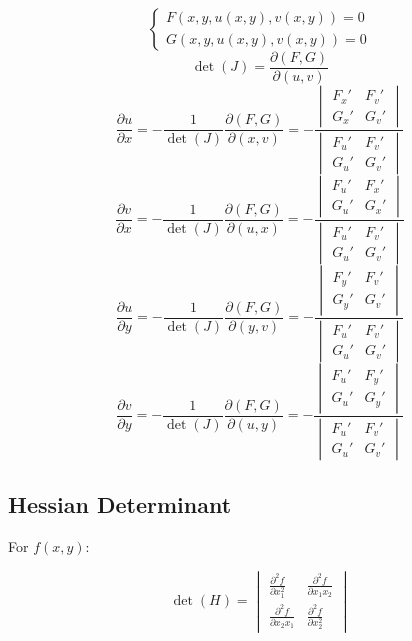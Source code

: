 \documentclass{article}
\begin{document}
\[
    \begin{cases}
        F(x, y, u(x, y), v(x, y)) = 0 \\
        G(x, y, u(x, y), v(x, y)) = 0
    \end{cases}
\]
\[
    \det(J) = \frac{\partial(F, G)}{\partial(u, v)}
\]
\[
    \frac{\partial u}{\partial x} = -\frac{1}{\det(J)} \frac{\partial(F, G)}{\partial(x, v)} = -\frac{\begin{vmatrix} F_x' & F_v' \\ G_x' & G_v' \end{vmatrix}}{\begin{vmatrix} F_u' & F_v' \\ G_u' & G_v' \end{vmatrix}}
\]
\[
    \frac{\partial v}{\partial x} = -\frac{1}{\det(J)} \frac{\partial(F, G)}{\partial(u, x)} = -\frac{\begin{vmatrix} F_u' & F_x' \\ G_u' & G_x' \end{vmatrix}}{\begin{vmatrix} F_u' & F_v' \\ G_u' & G_v' \end{vmatrix}}
\]
\[
    \frac{\partial u}{\partial y} = -\frac{1}{\det(J)} \frac{\partial(F, G)}{\partial(y, v)} = -\frac{\begin{vmatrix} F_y' & F_v' \\ G_y' & G_v' \end{vmatrix}}{\begin{vmatrix} F_u' & F_v' \\ G_u' & G_v' \end{vmatrix}}
\]
\[
    \frac{\partial v}{\partial y} = -\frac{1}{\det(J)} \frac{\partial(F, G)}{\partial(u, y)} = -\frac{\begin{vmatrix} F_u' & F_y' \\ G_u' & G_y' \end{vmatrix}}{\begin{vmatrix} F_u' & F_v' \\ G_u' & G_v' \end{vmatrix}}
\]

\subsection{Hessian Determinant}

For $f(x, y)$:

\[
    \det(H) = \begin{vmatrix}
        \frac{\partial^2 f}{\partial x_1^2} & \frac{\partial^2 f}{\partial x_1 x_2} \\
        \frac{\partial^2 f}{\partial x_2 x_1} & \frac{\partial^2 f}{\partial x_2^2}
    \end{vmatrix}
\]
\end{document}
